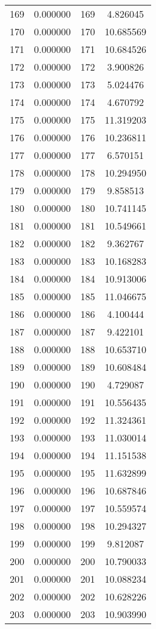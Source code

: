 \documentclass[12pt]{article}
\begin{document}
\begin{longtable}{@{}cccc@{}}
169 & 0.000000 & 169 & 4.826045 \\
170 & 0.000000 & 170 & 10.685569 \\
171 & 0.000000 & 171 & 10.684526 \\
172 & 0.000000 & 172 & 3.900826 \\
173 & 0.000000 & 173 & 5.024476 \\
174 & 0.000000 & 174 & 4.670792 \\
175 & 0.000000 & 175 & 11.319203 \\
176 & 0.000000 & 176 & 10.236811 \\
177 & 0.000000 & 177 & 6.570151 \\
178 & 0.000000 & 178 & 10.294950 \\
179 & 0.000000 & 179 & 9.858513 \\
180 & 0.000000 & 180 & 10.741145 \\
181 & 0.000000 & 181 & 10.549661 \\
182 & 0.000000 & 182 & 9.362767 \\
183 & 0.000000 & 183 & 10.168283 \\
184 & 0.000000 & 184 & 10.913006 \\
185 & 0.000000 & 185 & 11.046675 \\
186 & 0.000000 & 186 & 4.100444 \\
187 & 0.000000 & 187 & 9.422101 \\
188 & 0.000000 & 188 & 10.653710 \\
189 & 0.000000 & 189 & 10.608484 \\
190 & 0.000000 & 190 & 4.729087 \\
191 & 0.000000 & 191 & 10.556435 \\
192 & 0.000000 & 192 & 11.324361 \\
193 & 0.000000 & 193 & 11.030014 \\
194 & 0.000000 & 194 & 11.151538 \\
195 & 0.000000 & 195 & 11.632899 \\
196 & 0.000000 & 196 & 10.687846 \\
197 & 0.000000 & 197 & 10.559574 \\
198 & 0.000000 & 198 & 10.294327 \\
199 & 0.000000 & 199 & 9.812087 \\
200 & 0.000000 & 200 & 10.790033 \\
201 & 0.000000 & 201 & 10.088234 \\
202 & 0.000000 & 202 & 10.628226 \\
203 & 0.000000 & 203 & 10.903990 \\

\end{longtable}
\end{document}
